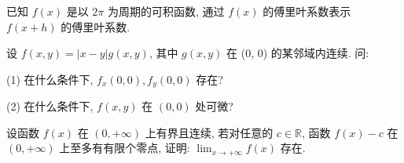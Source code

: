 \par{}
已知 $f(x)$ 是以 $2\pi$ 为周期的可积函数, 通过 $f(x)$ 的傅里叶系数表示 $f(x + h)$ 的傅里叶系数.\par
\par{}
设 $f(x, y) = |x - y| g(x, y)$, 其中 $g(x, y)$ 在 (0, 0) 的某邻域内连续. 问:\par
(1) 在什么条件下, $f_{x}(0,0), f_{y}(0,0)$ 存在?\par
(2) 在什么条件下, $f(x,y)$ 在 $(0,0)$ 处可微?\par
\par{}
设函数 $f(x)$ 在 $(0, +\infty)$ 上有界且连续, 若对任意的 $c \in \mathbb{R}$, 函数 $f(x) - c$ 在 $(0, +\infty)$ 上至多有有限个零点, 证明: $\lim_{x \to +\infty} f(x)$ 存在.\par

